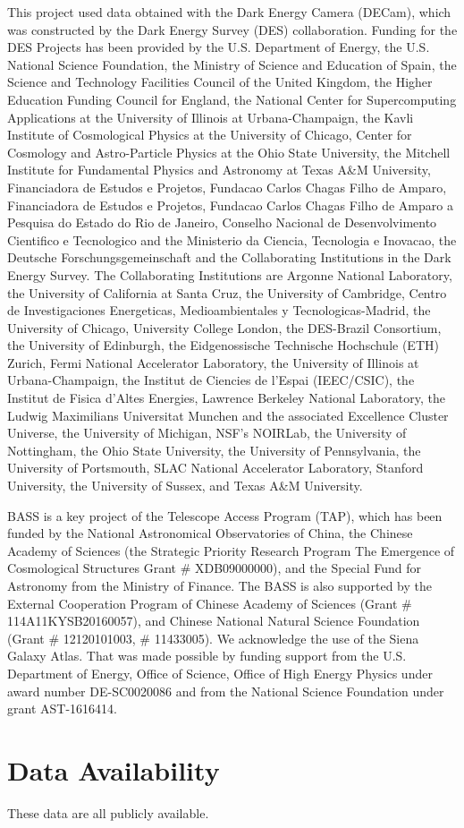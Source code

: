 \documentclass{article}
\begin{document}
This project used data obtained with the Dark Energy Camera (DECam), which was constructed by the Dark Energy Survey (DES) collaboration. Funding for the DES Projects has been provided by the U.S. Department of Energy, the U.S. National Science Foundation, the Ministry of Science and Education of Spain, the Science and Technology Facilities Council of the United Kingdom, the Higher Education Funding Council for England, the National Center for Supercomputing Applications at the University of Illinois at Urbana-Champaign, the Kavli Institute of Cosmological Physics at the University of Chicago, Center for Cosmology and Astro-Particle Physics at the Ohio State University, the Mitchell Institute for Fundamental Physics and Astronomy at Texas A\&M University, Financiadora de Estudos e Projetos, Fundacao Carlos Chagas Filho de Amparo, Financiadora de Estudos e Projetos, Fundacao Carlos Chagas Filho de Amparo a Pesquisa do Estado do Rio de Janeiro, Conselho Nacional de Desenvolvimento Cientifico e Tecnologico and the Ministerio da Ciencia, Tecnologia e Inovacao, the Deutsche Forschungsgemeinschaft and the Collaborating Institutions in the Dark Energy Survey. 
 The Collaborating Institutions are Argonne National Laboratory, the University of California at Santa Cruz, the University of Cambridge, Centro de Investigaciones Energeticas, Medioambientales y Tecnologicas-Madrid, the University of Chicago, University College London, the DES-Brazil Consortium, the University of Edinburgh, the Eidgenossische Technische Hochschule (ETH) Zurich, Fermi National Accelerator Laboratory, the University of Illinois at Urbana-Champaign, the Institut de Ciencies de l'Espai (IEEC/CSIC), the Institut de Fisica d'Altes Energies, Lawrence Berkeley National Laboratory, the Ludwig Maximilians Universitat Munchen and the associated Excellence Cluster Universe, the University of Michigan, NSF's NOIRLab, the University of Nottingham, the Ohio State University, the University of Pennsylvania, the University of Portsmouth, SLAC National Accelerator Laboratory, Stanford University, the University of Sussex, and Texas A\&M University.

BASS is a key project of the Telescope Access Program (TAP), which has been funded by the National Astronomical Observatories of China, the Chinese Academy of Sciences (the Strategic Priority Research Program The Emergence of Cosmological Structures Grant \# XDB09000000), and the Special Fund for Astronomy from the Ministry of Finance. The BASS is also supported by the External Cooperation Program of Chinese Academy of Sciences (Grant \# 114A11KYSB20160057), and Chinese National Natural Science Foundation (Grant \# 12120101003, \# 11433005).
We acknowledge the use of the %
 Siena Galaxy Atlas. That was made possible by funding support from the U.S. Department of Energy, Office of Science, Office of High Energy Physics under award number DE-SC0020086 and from the National Science Foundation under grant AST-1616414.

\section*{Data Availability}
These data are all publicly available.
\end{document}
